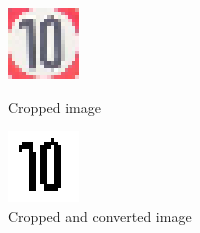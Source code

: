 \begin{figure}[H]
	\includegraphics[width=\linewidth]{images/2020.png}
	\caption{Cropped image}\label{fig:2020}
	\endminipage\hfill
	\includegraphics[width=\linewidth]{images/binaryimg.png}
	\caption{Cropped and converted image}\label{fig:2020bin}
	\endminipage\hfill
	\newline
	
\end{figure}

